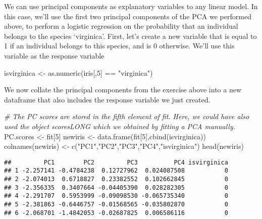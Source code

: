 \documentclass[
]{book}
\newenvironment{Shaded}{\begin{snugshade}}{\end{snugshade}}
\newcommand{\CommentTok}[1]{\textcolor[rgb]{0.56,0.35,0.01}{\textit{#1}}}
\newcommand{\DecValTok}[1]{\textcolor[rgb]{0.00,0.00,0.81}{#1}}
\newcommand{\FunctionTok}[1]{\textcolor[rgb]{0.00,0.00,0.00}{#1}}
\newcommand{\NormalTok}[1]{#1}
\newcommand{\OtherTok}[1]{\textcolor[rgb]{0.56,0.35,0.01}{#1}}
\newcommand{\SpecialCharTok}[1]{\textcolor[rgb]{0.00,0.00,0.00}{#1}}
\newcommand{\StringTok}[1]{\textcolor[rgb]{0.31,0.60,0.02}{#1}}
\begin{document}
We can use principal components as explanatory variables to any linear model. In this case, we'll use the first two principal components of the PCA we performed above, to perform a logistic regression on the probability that an individual belongs to the species `virginica'. First, let's create a new variable that is equal to 1 if an individual belongs to this species, and is 0 otherwise. We'll use this variable as the response variable

\begin{Shaded}
\begin{Highlighting}[]
\NormalTok{isvirginica }\OtherTok{\textless{}{-}}  \FunctionTok{as.numeric}\NormalTok{(iris[,}\DecValTok{5}\NormalTok{] }\SpecialCharTok{==} \StringTok{"virginica"}\NormalTok{)}
\end{Highlighting}
\end{Shaded}

We now collate the principal components from the exercise above into a new dataframe that also includes the response variable we just created.

\begin{Shaded}
\begin{Highlighting}[]
\CommentTok{\# The PC scores are stored in the fifth element of fit. Here, we could have also used the object scoresLONG which we obtained by fitting a PCA manually.}
\NormalTok{PC.scores }\OtherTok{\textless{}{-}}\NormalTok{ fit[}\DecValTok{5}\NormalTok{] }
\NormalTok{newiris }\OtherTok{\textless{}{-}} \FunctionTok{data.frame}\NormalTok{(fit[}\DecValTok{5}\NormalTok{],}\FunctionTok{cbind}\NormalTok{(isvirginica))}
\FunctionTok{colnames}\NormalTok{(newiris) }\OtherTok{\textless{}{-}} \FunctionTok{c}\NormalTok{(}\StringTok{"PC1"}\NormalTok{,}\StringTok{"PC2"}\NormalTok{,}\StringTok{"PC3"}\NormalTok{,}\StringTok{"PC4"}\NormalTok{,}\StringTok{"isvirginica"}\NormalTok{)}
\FunctionTok{head}\NormalTok{(newiris)}
\end{Highlighting}
\end{Shaded}

\begin{verbatim}
##         PC1        PC2         PC3          PC4 isvirginica
## 1 -2.257141 -0.4784238  0.12727962  0.024087508           0
## 2 -2.074013  0.6718827  0.23382552  0.102662845           0
## 3 -2.356335  0.3407664 -0.04405390  0.028282305           0
## 4 -2.291707  0.5953999 -0.09098530 -0.065735340           0
## 5 -2.381863 -0.6446757 -0.01568565 -0.035802870           0
## 6 -2.068701 -1.4842053 -0.02687825  0.006586116           0
\end{verbatim}
\end{document}
